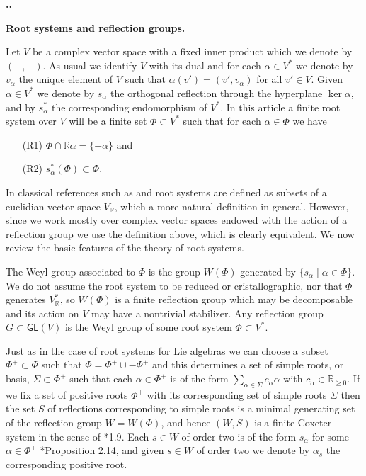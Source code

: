 \documentclass[11pt,fleqn]{amsart}
\renewcommand\thesection{\arabic{section}}
\newcounter{para}[section]
\renewcommand\thepara{\thesection.\arabic{para}}
\def\paragraph{%
 \noindent
 \refstepcounter{para}%
 \textbf{\thepara.}\hspace{1ex}%
}
\newcommand\about[1]{%
 {\bfseries#1.}%
}
\newcommand\RR{\mathbb R}
\begin{document}
\paragraph
\about{Root systems and reflection groups}
Let $V$ be a complex vector space with a fixed inner product which we denote 
by $(-,-)$. As usual we identify $V$ with its dual and for each $\alpha \in
V^*$ we denote by $v_\alpha$ the unique element of $V$ such that $\alpha(v') = 
(v', v_\alpha)$ for all $v' \in V$. Given $\alpha \in V^*$ we denote by 
$s_\alpha$ the orthogonal reflection through the hyperplane $\ker \alpha$, and 
by $s_\alpha^*$ the corresponding endomorphism of $V^*$. In this article a
finite root system over $V$ will be a finite set $\Phi \subset V^*$ such that 
for each $\alpha \in \Phi$ we have 
\begin{itemize}
\item[(R1)] $\Phi \cap \RR \alpha = \{\pm \alpha\}$ and
\item[(R2)] $s_\alpha^*(\Phi) \subset \Phi$.
\end{itemize}

In classical references such as \cite{Hump-coxeter-book} and 
\cite{Hiller-coxeter-book} root systems are defined as subsets of a euclidian
vector space $V_\RR$, which a more natural definition in general. However,
since we work mostly over complex vector spaces endowed with the action of a 
reflection group we use the definition above, which is clearly equivalent. We 
now review the basic features of the theory of root systems.

The Weyl group associated to $\Phi$ is the group $W(\Phi)$ generated by 
$\{s_\alpha \mid \alpha \in \Phi\}$. We do not assume the root system to be 
reduced or cristallographic, nor that $\Phi$ generates $V_\RR^*$, so $W(\Phi)$ 
is a finite reflection group which may be decomposable and its action on $V$ 
may have a nontrivial stabilizer. Any reflection group $G \subset 
\mathsf{GL}(V)$ is the Weyl group of some root system $\Phi \subset V^*$.

Just as in the case of root systems for Lie algebras we can choose a subset 
$\Phi^+ \subset \Phi$ such that $\Phi = \Phi^+ \cup - \Phi^+$ and this 
determines a set of simple roots, or basis, $\Sigma \subset \Phi^+$ such that 
each $\alpha \in \Phi^+$ is of the form $\sum_{\alpha \in \Sigma} c_\alpha 
\alpha$ with $c_\alpha \in \RR_{\geq 0}$. If we fix a set of positive roots 
$\Phi^+$ with its corresponding set of simple roots $\Sigma$ then the set $S$ 
of reflections corresponding to simple roots is a minimal generating set of the
reflection group $W = W(\Phi)$, and hence $(W,S)$ is a finite Coxeter system 
in the sense of \cite{Hump-coxeter-book}*{1.9}. Each $s \in W$ of order two is 
of the form $s_\alpha$ for some $\alpha \in \Phi^+$ 
\cite{Hump-coxeter-book}*{Proposition 2.14}, and given $s \in W$ of order 
two we denote by $\alpha_s$ the corresponding positive root.
\end{document}
